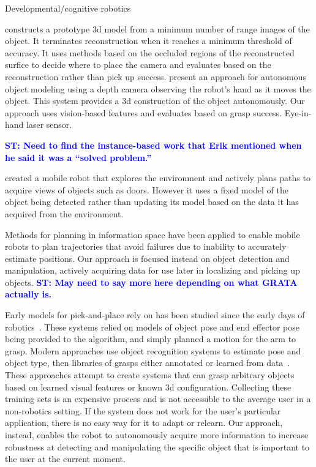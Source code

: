 \documentclass[conference]{IEEEtran}
\newcommand{\stnote}[1]{\textcolor{blue}{\textbf{ST: #1}}}
\begin{document}
Developmental/cognitive robotics~\citep{lyubova13, kraft10r}

\citet{banta00} constructs a prototype 3d model from a minimum number
of range images of the object.  It terminates reconstruction when it
reaches a minimum threshold of accuracy.  It uses methods based on the
occluded regions of the reconstructed surfice to decide where to place
the camera and evaluates based on the reconstruction rather than pick
up success.  \citet{krainin11} present an approach for autonomous
object modeling using a depth camera observing the robot's hand as it
moves the object.  This system provides a 3d construction of the
object autonomously.  Our approach uses vision-based features and
evaluates based on grasp success.  Eye-in-hand laser
sensor.~\citep{aeotti14}

\stnote{Need to find the instance-based work that Erik mentioned when
  he said it was a ``solved problem.''}

\citet{velez11} created a mobile robot that explores the environment
and actively plans paths to acquire views of objects such as doors.
However it uses a fixed model of the object being detected rather than
updating its model based on the data it has acquired from the
environment.

Methods for planning in information space \citep{he08, atanasov13,
  prentice09} have been applied to enable mobile robots to plan
trajectories that avoid failures due to inability to accurately
estimate positions.  Our approach is focused instead on
object detection and manipulation, actively acquiring data for use
later in localizing and picking up objects. \stnote{May need to say
  more here depending on what GRATA actually is.}


Early models for pick-and-place rely on has been studied since the
early days of robotics~\citep{brooks83, lozano89}.  These systems
relied on models of object pose and end effector pose being provided to the
algorithm, and simply planned a motion for the arm to grasp.  Modern
approaches use object recognition systems to estimate pose and object
type, then libraries of grasps either annotated or learned from
data~\citep{saxena08, goldfeder09, morales03}.  These approaches
attempt to create systems that can grasp arbitrary objects based on
learned visual features or known 3d configuration.  Collecting these
training sets is an expensive process and is not accessible to the
average user in a non-robotics setting.  If the system does not work
for the user's particular application, there is no easy way for it to
adapt or relearn.  Our approach, instead, enables the robot to
autonomously acquire more information to increase robustness at
detecting and manipulating the specific object that is important to
the user at the current moment.
\end{document}
